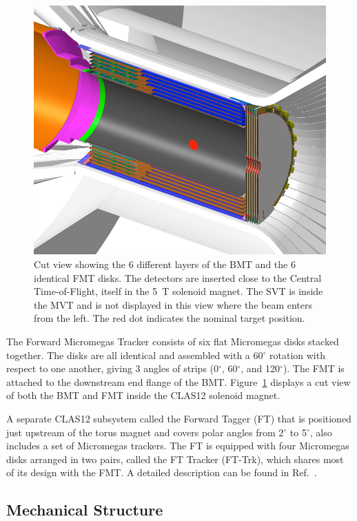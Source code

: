 \begin{figure}[htb]
 \includegraphics[width=1.0\columnwidth,keepaspectratio]{images/fig1}
 \caption{Cut view showing the 6 different layers of the BMT and the 6 identical FMT disks. The detectors are inserted
   close to the Central Time-of-Flight, itself in the 5~T solenoid magnet. The SVT is inside the MVT and is not displayed in
   this view where the beam enters from the left. The red dot indicates the nominal target position.}
 \label{fig:mm-fig1}
\end{figure}

The Forward Micromegas Tracker consists of six flat Micromegas disks stacked together. The disks are all identical and
assembled with a 60$^\circ$ rotation with respect to one another, giving 3 angles of strips (0$^\circ$, 60$^\circ$, and
120$^\circ$). The FMT is attached to the downstream end flange of the BMT. Figure~\ref{fig:mm-fig1} displays a cut view
of both the BMT and FMT inside the CLAS12 solenoid magnet.

A separate CLAS12 subsystem called the Forward Tagger (FT) that is positioned just upstream of the torus magnet
and covers polar angles from 2$^\circ$ to 5$^\circ$, also includes a set of Micromegas trackers. The FT is equipped
with four Micromegas disks arranged in two pairs, called the FT Tracker (FT-Trk), which shares most of its design
with the FMT. A detailed description can be found in Ref.~\cite{ft-nim}.

\subsection{Mechanical Structure}

